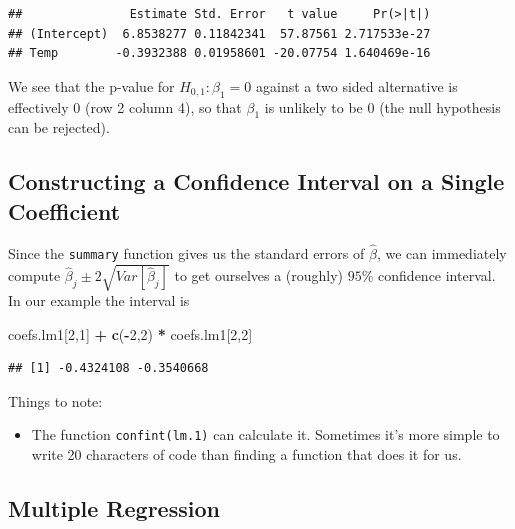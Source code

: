 \documentclass[]{book}
\newenvironment{Shaded}{\begin{snugshade}}{\end{snugshade}}
\newcommand{\DecValTok}[1]{\textcolor[rgb]{0.00,0.00,0.81}{#1}}
\newcommand{\KeywordTok}[1]{\textcolor[rgb]{0.13,0.29,0.53}{\textbf{#1}}}
\newcommand{\NormalTok}[1]{#1}
\newcommand{\OperatorTok}[1]{\textcolor[rgb]{0.81,0.36,0.00}{\textbf{#1}}}
\newcommand{\StringTok}[1]{\textcolor[rgb]{0.31,0.60,0.02}{#1}}
\providecommand{\tightlist}{%
  \setlength{\itemsep}{0pt}\setlength{\parskip}{0pt}}
\theoremstyle{definition}
\theoremstyle{definition}
\theoremstyle{definition}
\theoremstyle{remark}
\begin{document}
\begin{verbatim}
##               Estimate Std. Error   t value     Pr(>|t|)
## (Intercept)  6.8538277 0.11842341  57.87561 2.717533e-27
## Temp        -0.3932388 0.01958601 -20.07754 1.640469e-16
\end{verbatim}

We see that the p-value for \(H_{0,1}: \beta_1=0\) against a two sided alternative is effectively 0 (row 2 column 4), so that \(\beta_1\) is unlikely to be \(0\) (the null hypothesis can be rejected).

\hypertarget{constructing-a-confidence-interval-on-a-single-coefficient}{%
\subsection{Constructing a Confidence Interval on a Single Coefficient}\label{constructing-a-confidence-interval-on-a-single-coefficient}}

Since the \texttt{summary} function gives us the standard errors of \(\hat \beta\), we can immediately compute \(\hat \beta_j \pm 2 \sqrt{Var[\hat \beta_j]}\) to get ourselves a (roughly) \(95\%\) confidence interval.
In our example the interval is

\begin{Shaded}
\begin{Highlighting}[]
\NormalTok{coefs.lm1[}\DecValTok{2}\NormalTok{,}\DecValTok{1}\NormalTok{] }\OperatorTok{+}\StringTok{ }\KeywordTok{c}\NormalTok{(}\OperatorTok{-}\DecValTok{2}\NormalTok{,}\DecValTok{2}\NormalTok{) }\OperatorTok{*}\StringTok{ }\NormalTok{coefs.lm1[}\DecValTok{2}\NormalTok{,}\DecValTok{2}\NormalTok{]}
\end{Highlighting}
\end{Shaded}

\begin{verbatim}
## [1] -0.4324108 -0.3540668
\end{verbatim}

Things to note:

\begin{itemize}
\tightlist
\item
  The function \texttt{confint(lm.1)} can calculate it. Sometimes it's more simple to write 20 characters of code than finding a function that does it for us.
\end{itemize}

\hypertarget{multiple-regression}{%
\subsection{Multiple Regression}\label{multiple-regression}}
\end{document}

